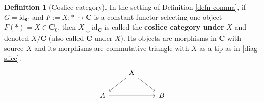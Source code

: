 \documentclass{article}
\theoremstyle{definition}
\newtheorem{defn}[thm]{Definition}
\theoremstyle{remark}
\newcommand{\id}{\text{id}}
\newcommand{\comcat}[2]{#1\downarrow #2}
\begin{document}
\begin{defn}[Coslice category]
    In the setting of Definition \ref{defn-comma}, if $G = \id_{\mathbf{C}}$ and $F:= X: \ast \rightsquigarrow \mathbf{C}$ is a constant functor selecting one object $F(\ast) = X \in \mathbf{C}_0$, then $\comcat{X}{\id_{\mathbf{C}}}$ is called the \textbf{coslice category under} $X$ and denoted $X/\mathbf{C}$ (also called $\mathbf{C}$ under $X$). Its objects are morphisms in $\mathbf{C}$ with source $X$ and its morphisms are commutative triangle with $X$ as a tip as in \eqref{diag-slice}.
    \begin{equation}\label{diag-slice}
        \begin{tikzcd}
            & X \arrow[ld] \arrow[rd] &\\
            A \arrow[rr]  & & B 
        \end{tikzcd}
    \end{equation}
\end{defn}
\end{document}
